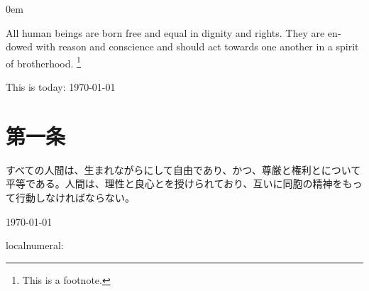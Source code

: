 \documentclass{article}
\begin{document}
\parindent0em

\begin{center}
	\abstractname
\end{center}
\begin{english}
All human beings are born free and equal in dignity and rights.
They are endowed with reason and conscience and should act towards one another in a spirit of brotherhood.
\footnote{%
	This is a footnote.}

This is today: \today
\end{english}

\section{第一条}

すべての人間は、生まれながらにして自由であり、かつ、尊厳と権利とについて平等である。人間は、理性と良心とを授けられており、互いに同胞の精神をもって行動しなければならない。

\today

localnumeral: 
\end{document}
